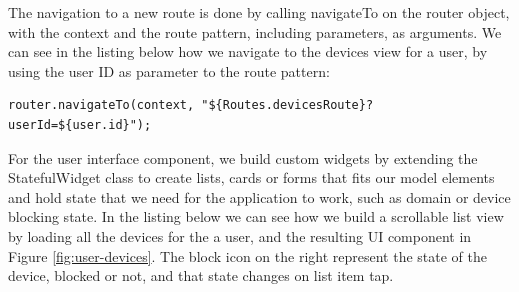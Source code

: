 The navigation to a new route is done by calling navigateTo on the router object, with the context and the route pattern, including parameters, as arguments. We can see in the listing below how we navigate to the devices view for a user, by using the user ID as parameter to the route pattern:

\begin{lstlisting}
router.navigateTo(context, "${Routes.devicesRoute}?userId=${user.id}");
\end{lstlisting}

For the user interface component, we build custom widgets by extending the StatefulWidget class to create lists, cards or forms that fits our model elements and hold state that we need for the application to work, such as domain or device blocking state. In the listing below we can see how we build a scrollable list view by loading all the devices for the a user, and the resulting UI component in Figure \ref{fig:user-devices}. The block icon on the right represent the state of the device, blocked or not, and that state changes on list item tap.


